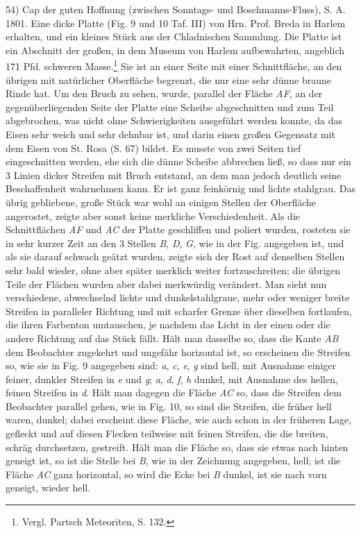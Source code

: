 \documentclass[a4paper, 11pt, oneside]{article}
\begin{document}
54) Cap der guten Hoffnung (zwischen Sonntags- und Boschmanns-Fluss), S. A. 1801. Eine dicke Platte (Fig. 9 und 10 Taf. III) von Hrn. Prof. Breda in Harlem erhalten, und ein kleines Stück aus der Chladnischen Sammlung. Die Platte ist ein Abschnitt der großen, in dem Museum von Harlem aufbewahrten, angeblich 171 Pfd. schweren Masse.\footnote{Vergl. Partsch Meteoriten, S. 132.} Sie ist an einer Seite mit einer Schnittfläche, an den übrigen mit natürlicher Oberfläche begrenzt, die nur eine sehr dünne braune Rinde hat. Um den Bruch zu sehen, wurde, parallel der Fläche \emph{AF}, an der gegenüberliegenden Seite der Platte eine Scheibe abgeschnitten und zum Teil abgebrochen, was nicht ohne Schwierigkeiten ausgeführt werden konnte, da das Eisen sehr weich und sehr dehnbar ist, und darin einen großen Gegensatz mit dem Eisen von St. Rosa (S. 67) bildet. Es musste von zwei Seiten tief eingeschnitten werden, ehe sich die dünne Scheibe abbrechen ließ, so dass nur ein 3 Linien dicker Streifen mit Bruch entstand, an dem man jedoch deutlich seine Beschaffenheit wahrnehmen kann. Er ist ganz feinkörnig und lichte stahlgrau. Das übrig gebliebene, große Stück war wohl an einigen Stellen der Oberfläche angerostet, zeigte aber sonst keine merkliche Verschiedenheit. Als die Schnittflächen \emph{AF} und \emph{AC} der Platte geschliffen und poliert wurden, rosteten sie in sehr kurzer Zeit an den 3 Stellen \emph{B}, \emph{D}, \emph{G}, wie in der Fig. angegeben ist, und als sie darauf schwach geätzt wurden, zeigte sich der Rost auf denselben Stellen sehr bald wieder, ohne aber später merklich weiter fortzuschreiten; die übrigen Teile der Flächen wurden aber dabei merkwürdig verändert. Man sieht nun verschiedene, abwechselnd lichte und dunkelstahlgraue, mehr oder weniger breite Streifen in paralleler Richtung und mit scharfer Grenze über dieselben fortlaufen, die ihren Farbenton umtauschen, je nachdem das Licht in der einen oder die andere Richtung auf das Stück fällt. Hält man dasselbe so, dass die Kante \emph{AB} dem Beobachter zugekehrt und ungefähr horizontal ist, so erscheinen die Streifen so, wie sie in Fig. 9 angegeben sind: \emph{a}, \emph{c}, \emph{e}, \emph{g} sind hell, mit Ausnahme einiger feiner, dunkler Streifen in \emph{e} und \emph{g}; \emph{a}, \emph{d}, \emph{f}, \emph{h} dunkel, mit Ausnahme des hellen, feinen Streifen in \emph{d}. Hält man dagegen die Fläche \emph{AC} so, dass die Streifen dem Beobachter parallel gehen, wie in Fig. 10, so sind die Streifen, die früher hell waren, dunkel; dabei erscheint diese Fläche, wie auch schon in der früheren Lage, gefleckt und auf diesen Flecken teilweise mit feinen Streifen, die die breiten, schräg durchsetzen, gestreift. Hält man die Fläche so, dass sie etwas nach hinten geneigt ist, so ist die Stelle bei \emph{B}, wie in der Zeichnung angegeben, hell; ist die Fläche \emph{AC} ganz horizontal, so wird die Ecke bei \emph{B} dunkel, ist sie nach vorn geneigt, wieder hell.
\end{document}
